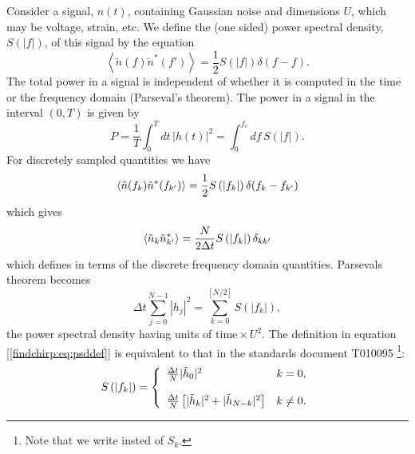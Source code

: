 Consider a signal, $n(t)$, containing Gaussian noise and dimensions $U$, which
may be voltage, strain, etc. We define the (one sided) power spectral density,
$S(|f|)$, of this signal by the equation
\begin{equation}
\left\langle\tilde{n}(f) \tilde{n}^\ast(f')\right\rangle = 
\frac{1}{2}S\left(\left|f\right|\right)\delta(f-f).
\end{equation}
The total power in a signal is independent of whether it is computed in the
time or the frequency domain (Parseval's theorem). The power in a signal in
the interval $(0,T)$  is given by
\begin{equation}
P = \frac{1}{T} \int_{0}^{T} dt\, \left|h(t)\right|^2 = 
\int_{0}^{f_c} df\, S\left(\left|f\right|\right).
\end{equation}
For discretely sampled quantities we have
\begin{equation}
\left\langle\tilde{n}(f_k) \tilde{n}^\ast(f_{k'})\right\rangle = 
\frac{1}{2}S\left(\left|f_{k}\right|\right)\delta(f_k-f_{k'})
\end{equation}
which gives
\begin{equation}
\label{findchirp:eq:ospsddef}
\left\langle\tilde{n}_k \tilde{n}_{k'}^\ast\right\rangle = 
\frac{N}{2\Delta t}S\left(\left|f_{k}\right|\right)\delta_{kk'}
\end{equation}
which defines \ospsd in terms of the discrete frequency domain quantities.
Parsevals theorem becomes
\begin{equation}
\Delta t \sum_{j=0}^{N-1} |h_j|^2 
= \sum_{k=0}^{[N/2]} S\left(\left|f_k\right|\right),
\end{equation}
the power spectral density having units of $\mathrm{time}\times U^2$. The
definition in equation [\ref{findchirp:eq:psddef}] is equivalent to that in
the standards document T010095%
\footnote{Note that we write \ospsd insted of $S_k$.}:
\begin{equation}
S\left(\left|f_{k}\right|\right) = \left\{
\begin{array}{ll}
\frac{\Delta t}{N} | \tilde{h}_0 |^2 & k = 0, \\
\\
\frac{\Delta t}{N} \left[ | \tilde{h}_k |^2 + | \tilde{h}_{N-k} |^2 \right] &
k\neq 0.
\end{array}
\right.
\end{equation}

\newpage
\newpage
\newpage
\newpage
\newpage
